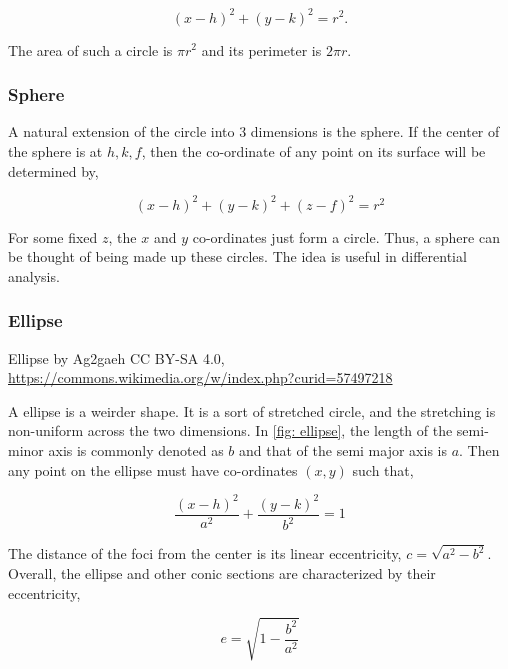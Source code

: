 \begin{equation}
    (x-h)^2 + (y-k)^2 = r^2.
\end{equation}

The area of such a circle is \(\pi r^2\) and its perimeter is \(2\pi r\). 

\subsubsection{Sphere}

A natural extension of the circle into \(3\) dimensions is the sphere. 
If the center of the sphere is at \(h, k, f\), then the co-ordinate 
of any point on its surface will be determined by, 

\begin{equation}
    (x-h)^2 + (y-k)^2 + (z-f)^2 = r^2
\end{equation}

For some fixed \(z\), the \(x\) and \(y\) co-ordinates just form 
a circle. Thus, a sphere can be thought of being made up these circles. The idea 
is useful in differential analysis.

\subsubsection{Ellipse}

\begin{marginfigure}
    \centering
    \caption{Ellipse by Ag2gaeh CC BY-SA 4.0, \url{https://commons.wikimedia.org/w/index.php?curid=57497218}}
    \label{fig: ellipse}
\end{marginfigure}


A ellipse is a weirder shape. It is a sort of stretched circle, and the 
stretching is non-uniform across the two dimensions. In \cref{fig: ellipse}, the 
length of the semi-minor axis is commonly denoted as \(b\) and that of the semi major 
axis is \(a\). Then any point on the ellipse must have co-ordinates \((x,y)\) such that,

\begin{equation}
    \frac{(x-h)^2}{a^2} + \frac{(y-k)^2}{b^2} = 1
\end{equation}

The distance of the foci from the center is its linear eccentricity, \(c = \sqrt{a^2 - b^2}\). 
Overall, the ellipse and other conic sections are characterized by their eccentricity, 

\begin{equation*}
    e = \sqrt{1 - \frac{b^2}{a^2}}
\end{equation*}

